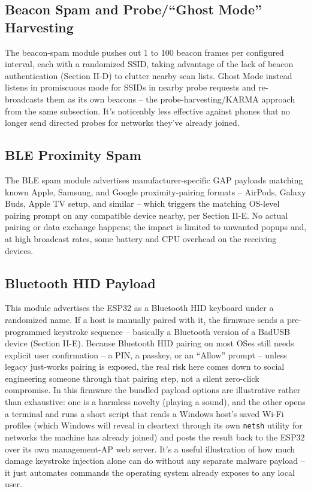 \documentclass[conference]{IEEEtran}
\begin{document}
\subsection{Beacon Spam and Probe/``Ghost Mode'' Harvesting}
The beacon-spam module pushes out 1 to 100 beacon frames per configured interval, each with a randomized SSID, taking advantage of the lack of beacon authentication (Section II-D) to clutter nearby scan lists. Ghost Mode instead listens in promiscuous mode for SSIDs in nearby probe requests and re-broadcasts them as its own beacons -- the probe-harvesting/KARMA approach from the same subsection. It's noticeably less effective against phones that no longer send directed probes for networks they've already joined.

\subsection{BLE Proximity Spam}
The BLE spam module advertises manufacturer-specific GAP payloads matching known Apple, Samsung, and Google proximity-pairing formats -- AirPods, Galaxy Buds, Apple TV setup, and similar -- which triggers the matching OS-level pairing prompt on any compatible device nearby, per Section II-E. No actual pairing or data exchange happens; the impact is limited to unwanted popups and, at high broadcast rates, some battery and CPU overhead on the receiving devices.

\subsection{Bluetooth HID Payload}
This module advertises the ESP32 as a Bluetooth HID keyboard under a randomized name. If a host is manually paired with it, the firmware sends a pre-programmed keystroke sequence -- basically a Bluetooth version of a BadUSB device (Section II-E). Because Bluetooth HID pairing on most OSes still needs explicit user confirmation -- a PIN, a passkey, or an ``Allow'' prompt -- unless legacy just-works pairing is exposed, the real risk here comes down to social engineering someone through that pairing step, not a silent zero-click compromise. In this firmware the bundled payload options are illustrative rather than exhaustive: one is a harmless novelty (playing a sound), and the other opens a terminal and runs a short script that reads a Windows host's saved Wi-Fi profiles (which Windows will reveal in cleartext through its own \texttt{netsh} utility for networks the machine has already joined) and posts the result back to the ESP32 over its own management-AP web server. It's a useful illustration of how much damage keystroke injection alone can do without any separate malware payload -- it just automates commands the operating system already exposes to any local user.
\end{document}
